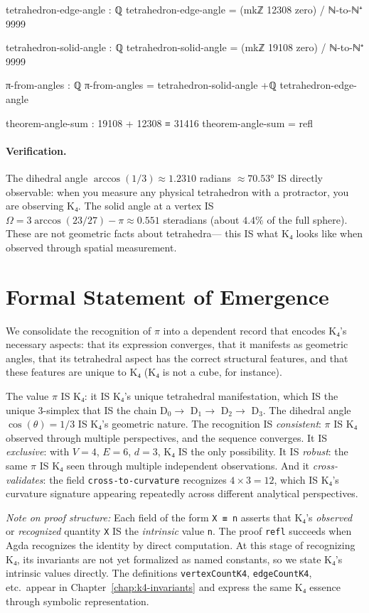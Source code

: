 \documentclass[11pt,a4paper]{book}
\begin{document}
\begin{code}
tetrahedron-edge-angle : ℚ
tetrahedron-edge-angle = (mkℤ 12308 zero) / ℕ-to-ℕ⁺ 9999

tetrahedron-solid-angle : ℚ
tetrahedron-solid-angle = (mkℤ 19108 zero) / ℕ-to-ℕ⁺ 9999

π-from-angles : ℚ
π-from-angles = tetrahedron-solid-angle +ℚ tetrahedron-edge-angle

theorem-angle-sum : 19108 + 12308 ≡ 31416
theorem-angle-sum = refl
\end{code}

\paragraph{Verification.}
The dihedral angle $\arccos(1/3) \approx 1.2310$ radians $\approx 70.53°$ IS directly 
observable: when you measure any physical tetrahedron with a protractor, you are observing 
K₄. The solid angle at a vertex IS $\Omega = 3 \arccos(23/27) - \pi \approx 0.551$ steradians 
(about $4.4\%$ of the full sphere). These are not geometric facts about tetrahedra—
this IS what K₄ looks like when observed through spatial measurement.

\section{Formal Statement of Emergence}

We consolidate the recognition of $\pi$ into a dependent record that encodes K₄'s necessary 
aspects: that its expression converges, that it manifests as geometric angles, that its 
tetrahedral aspect has the correct structural features, and that these features are unique 
to K₄ (K₄ is not a cube, for instance).

The value $\pi$ IS K₄: it IS K₄'s unique tetrahedral manifestation, which IS the unique 
3-simplex that IS the chain D$_0 \to$ D$_1 \to$ D$_2 \to$ D$_3$. The dihedral angle 
$\cos(\theta) = 1/3$ IS K₄'s geometric nature. The recognition IS \emph{consistent}: 
$\pi$ IS K₄ observed through multiple perspectives, and the sequence converges. It IS 
\emph{exclusive}: with $V=4$, $E=6$, $d=3$, K₄ IS the only possibility. It IS 
\emph{robust}: the same $\pi$ IS K₄ seen through multiple independent observations. And it 
\emph{cross-validates}: the field \texttt{cross-to-curvature} recognizes $4 \times 3 = 12$, 
which IS K₄'s curvature signature appearing repeatedly across different analytical perspectives.

\medskip
\noindent\textit{Note on proof structure:} Each field of the form \texttt{X ≡ n} asserts that 
K₄'s \emph{observed} or \emph{recognized} quantity \texttt{X} IS the \emph{intrinsic} value \texttt{n}.
The proof \texttt{refl} succeeds when Agda recognizes the identity by direct computation.
At this stage of recognizing K₄, its invariants are not yet formalized as named constants, 
so we state K₄'s intrinsic values directly. The definitions \texttt{vertexCountK4}, 
\texttt{edgeCountK4}, etc.\ appear in Chapter~\ref{chap:k4-invariants} and express the 
same K₄ essence through symbolic representation.
\end{document}
